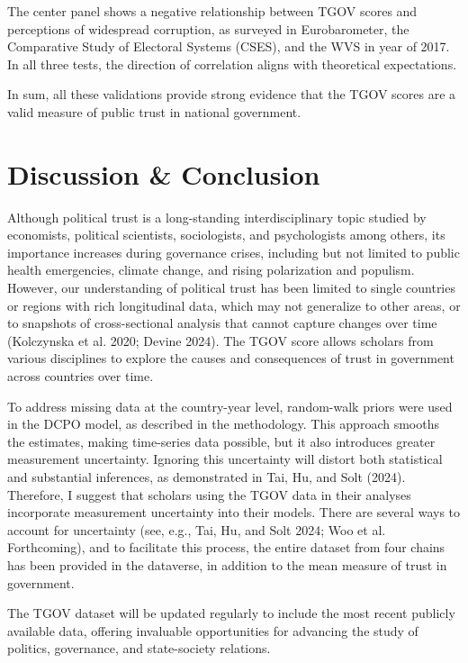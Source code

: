 \documentclass[
  12pt,
]{article}
\begin{document}
The center panel shows a negative relationship between TGOV scores and perceptions of widespread corruption, as surveyed in Eurobarometer, the Comparative Study of Electoral Systems (CSES), and the WVS in year of 2017.
In all three tests, the direction of correlation aligns with theoretical expectations.

In sum, all these validations provide strong evidence that the TGOV scores are a valid measure of public trust in national government.

\section{Discussion \& Conclusion}\label{discussion-conclusion}

Although political trust is a long-standing interdisciplinary topic studied by economists, political scientists, sociologists, and psychologists among others, its importance increases during governance crises, including but not limited to public health emergencies, climate change, and rising polarization and populism.
However, our understanding of political trust has been limited to single countries or regions with rich longitudinal data, which may not generalize to other areas, or to snapshots of cross-sectional analysis that cannot capture changes over time (Kolczynska et al. 2020; Devine 2024).
The TGOV score allows scholars from various disciplines to explore the causes and consequences of trust in government across countries over time.

To address missing data at the country-year level, random-walk priors were used in the DCPO model, as described in the methodology.
This approach smooths the estimates, making time-series data possible, but it also introduces greater measurement uncertainty.
Ignoring this uncertainty will distort both statistical and substantial inferences, as demonstrated in Tai, Hu, and Solt (2024).
Therefore, I suggest that scholars using the TGOV data in their analyses incorporate measurement uncertainty into their models.
There are several ways to account for uncertainty (see, e.g., Tai, Hu, and Solt 2024; Woo et al. Forthcoming), and to facilitate this process, the entire dataset from four chains has been provided in the dataverse, in addition to the mean measure of trust in government.

The TGOV dataset will be updated regularly to include the most recent publicly available data, offering invaluable opportunities for advancing the study of politics, governance, and state-society relations.
\end{document}
